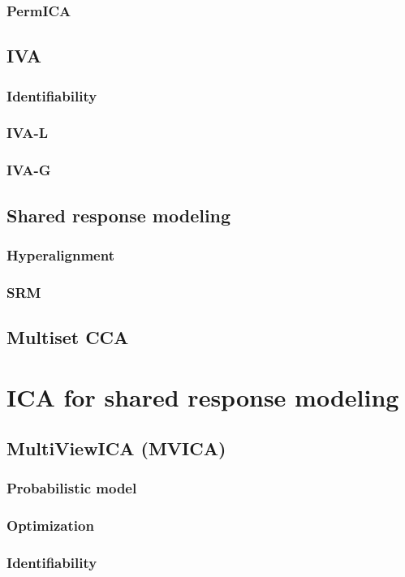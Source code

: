 \documentclass[12pt]{report}
\begin{document}
\subsection{PermICA}
\section{IVA}
\subsection{Identifiability}
\subsection{IVA-L}
\subsection{IVA-G}
\section{Shared response modeling}
\subsection{Hyperalignment}
\subsection{SRM}
\section{Multiset CCA}
\chapter{ICA for shared response modeling}
\section{MultiViewICA (MVICA)}
\subsection{Probabilistic model}
\subsection{Optimization}
\subsection{Identifiability}
\end{document}
